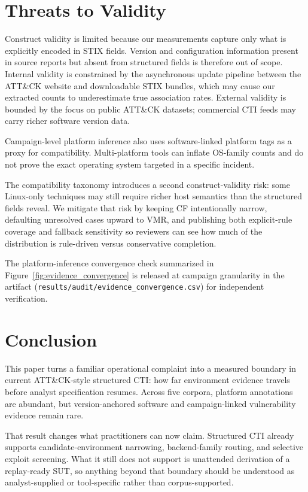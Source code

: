 \documentclass[sigconf]{acmart}
\begin{document}
\section{Threats to Validity}

Construct validity is limited because our measurements capture only what is explicitly encoded in STIX fields. Version and configuration information present in source reports but absent from structured fields is therefore out of scope. Internal validity is constrained by the asynchronous update pipeline between the ATT\&CK website and downloadable STIX bundles, which may cause our extracted counts to underestimate true association rates. External validity is bounded by the focus on public ATT\&CK datasets; commercial CTI feeds may carry richer software version data.

Campaign-level platform inference also uses software-linked platform tags as a proxy for compatibility. Multi-platform tools can inflate OS-family counts and do not prove the exact operating system targeted in a specific incident.

The compatibility taxonomy introduces a second construct-validity risk: some Linux-only techniques may still require richer host semantics than the structured fields reveal. We mitigate that risk by keeping CF intentionally narrow, defaulting unresolved cases upward to VMR, and publishing both explicit-rule coverage and fallback sensitivity so reviewers can see how much of the distribution is rule-driven versus conservative completion.

The platform-inference convergence check summarized in Figure~\ref{fig:evidence_convergence} is released at campaign granularity in the artifact (\nolinkurl{results/audit/evidence\_convergence.csv}) for independent verification.


\section{Conclusion}\label{sec:conclusion}

This paper turns a familiar operational complaint into a measured boundary in current ATT\&CK-style structured CTI: how far environment evidence travels before analyst specification resumes. Across five corpora, platform annotations are abundant, but version-anchored software and campaign-linked vulnerability evidence remain rare.

That result changes what practitioners can now claim. Structured CTI already supports candidate-environment narrowing, backend-family routing, and selective exploit screening. What it still does not support is unattended derivation of a replay-ready SUT, so anything beyond that boundary should be understood as analyst-supplied or tool-specific rather than corpus-supported.
\end{document}
